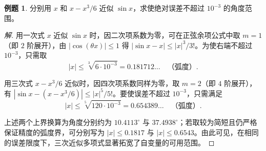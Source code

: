 \documentclass[UTF8,fontset=fandol,a4paper,12pt]{ctexart}
\theoremstyle{definition}
\newtheorem{example}[theorem]{例题}
\begin{document}
\begin{example}
分别用 $x$ 和 $x-x^3/6$ 近似 $\sin x$，求使绝对误差不超过 $10^{-3}$ 的角度范围。
\end{example}

\begin{proof}[解]
用一次式 $x$ 近似 $\sin x$ 时，因二次项系数为零，可在正弦余项公式中取 $m=1$（即 $2$ 阶展开），由 $|\cos(\theta x)|\le1$ 得 $|\sin x-x|\le |x|^3/3!$。为使右端不超过 $10^{-3}$，只需取
\[
 |x|\le\sqrt[3]{6\cdot10^{-3}}=0.181712\ldots\quad\text{（弧度）}.
\]

用三次式 $x-x^3/6$ 近似时，因四次项系数同样为零，取 $m=2$（即 $4$ 阶展开），有 $|\sin x-(x-x^3/6)|\le |x|^5/5!$。要使误差不超过 $10^{-3}$，只需满足
\[
 |x|\le\sqrt[5]{120\cdot10^{-3}}=0.654389\ldots\quad\text{（弧度）}.
\]

上述两个上界换算为角度分别约为 $10.4113^\circ$ 与 $37.4938^\circ$；若取较为简短且仍严格保证精度的弧度界，可分别写为 $|x|\le0.1817$ 与 $|x|\le0.6543$。由此可见，在相同的误差限度下，三次近似多项式显著拓宽了自变量的可用范围。
\end{proof}
\end{document}
